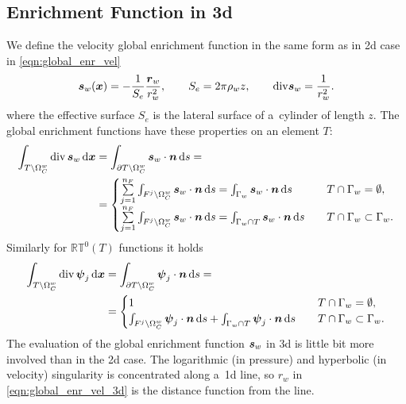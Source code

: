 \subsection{Enrichment Function in 3d}
We define the velocity global enrichment function in the same form as in 2d case in \eqref{eqn:global_enr_vel}
\begin{equation}
    \mathbf{\boldsymbol{s}}_w(\mathbf{\boldsymbol{x}}) = -\frac{1}{S_e} \frac{\mathbf{\boldsymbol{r}}_w}{r_w^2}, \qquad S_e = 2\pi\rho_w z
    , \qquad {\rm div} \mathbf{\boldsymbol{s}}_w = \frac{1}{r_w^2}.
    \label{eqn:global_enr_vel_3d}
\end{equation}
%
where the effective surface $S_e$ is the lateral surface of a~cylinder of length $z$.
The global enrichment functions have these properties on an element $T$:
\begin{align} \label{eqn:glob_flux_properties_3d}
    \int_{T\setminus \Omega^w_C} {\rm div}\,\mathbf{\boldsymbol{s}}_w \,{\rm d}\mathbf{\boldsymbol{x}}
    &= \int_{\partial T\setminus\Omega^w_C} \mathbf{\boldsymbol{s}}_w\cdot\mathbf{\boldsymbol{n}} \,{\rm d} s = \nonumber\\
    &= \begin{cases}
        \sum \limits_{j=1}^{n_F} \int_{F^j\setminus\Omega^w_C} \mathbf{\boldsymbol{s}}_w\cdot\mathbf{\boldsymbol{n}} \,{\rm d} s = 
            \int_{\Gamma_w} \mathbf{\boldsymbol{s}}_w\cdot\mathbf{\boldsymbol{n}} \,{\rm d} s
            &\quad T \cap \Gamma_w=\emptyset, \\
        \sum \limits_{j=1}^{n_F} \int_{F^j\setminus \Omega^w_C} \mathbf{\boldsymbol{s}}_w\cdot\mathbf{\boldsymbol{n}} \,{\rm d} s 
        = \int_{\Gamma_w\cap T} \mathbf{\boldsymbol{s}}_w\cdot\mathbf{\boldsymbol{n}} \,{\rm d} s &\quad T \cap \Gamma_w\subset\Gamma_w. \\
    \end{cases}
\end{align}
% 
Similarly for $\mathbb{RT}^0(T)$ functions it holds
\begin{align} \label{eqn:rt0_flux_properties_3d}
    \int_{T\setminus \Omega^w_C} {\rm div}\,\mathbf{\boldsymbol{\psi}}_{j}\,{\rm d}\mathbf{\boldsymbol{x}}
    &= \int_{\partial T\setminus \Omega^w_C} \mathbf{\boldsymbol{\psi}}_{j}\cdot\mathbf{\boldsymbol{n}} \,{\rm d} s = \nonumber\\
    &= \begin{cases}
        1 & \quad T \cap \Gamma_w=\emptyset, \\
        \int_{F^j\setminus \Omega^w_C} \mathbf{\boldsymbol{\psi}}_j\cdot\mathbf{\boldsymbol{n}} \,{\rm d} s
            +\int_{\Gamma_w\cap T} \mathbf{\boldsymbol{\psi}}_j\cdot\mathbf{\boldsymbol{n}} \,{\rm d} s
            &\quad T \cap \Gamma_w\subset\Gamma_w. \\
        \end{cases}
\end{align}
%
%
The evaluation of the global enrichment function $\mathbf{\boldsymbol{s}}_w$ in 3d is little bit more involved than in the 2d case.
The logarithmic (in pressure) and hyperbolic (in velocity) singularity is concentrated along a~1d line,
so $r_w$ in \eqref{eqn:global_enr_vel_3d} is the distance function from the line.

